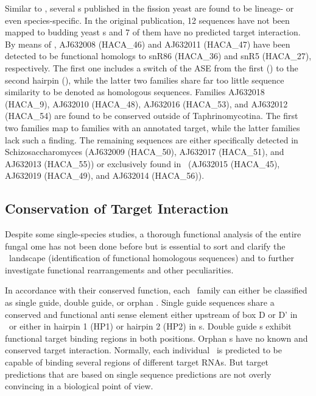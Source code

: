 Similar to \calb, several \sno s published in the fission yeast
\cite{Li:2005} are found to be lineage- or even species-specific. In the
original publication, 12 sequences have not been mapped to budding yeast
\sno s and 7 of them have no predicted target interaction. By means of
\snostrip, AJ632008 (HACA\_46) and AJ632011 (HACA\_47) have been detected
to be functional homologs to snR86 (HACA\_36) and snR5 (HACA\_27),
respectively. The first one includes a switch of the ASE from the first
(\spo) to the second hairpin (\sce), while the latter two families share
far too little sequence similarity to be denoted as homologous
sequences. Families AJ632018 (HACA\_9), AJ632010 (HACA\_48), AJ632016
(HACA\_53), and AJ632012 (HACA\_54) are found to be conserved outside of
Taphrinomycotina. The first two families map to families with an annotated
target, while the latter families lack such a finding. The remaining
sequences are either specifically detected in Schizosaccharomyces (AJ632009
(HACA\_50), AJ632017 (HACA\_51), and AJ632013 (HACA\_55)) or exclusively
found in \spo\ (AJ632015 (HACA\_45), AJ632019 (HACA\_49), and AJ632014
(HACA\_56)).

\subsection{Conservation of Target Interaction}

Despite some single-species studies, a thorough functional analysis of the
entire fungal \sno ome has not been done before but is essential to sort
and clarify the \sno\ landscape (identification of functional homologous
sequences) and to further investigate functional rearrangements and other
peculiarities.

In accordance with their conserved function, each \sno\ family can either
be classified as single guide, double guide, or orphan \sno. Single guide
sequences share a conserved and functional anti sense element either
upstream of box D or D' in \cd\ or either in hairpin 1 (HP1) or hairpin 2
(HP2) in \haca s. Double guide \sno s exhibit functional target binding
regions in both positions. Orphan \sno s have no known and conserved target
interaction. Normally, each individual \sno\ is predicted to be capable of
binding several regions of different target RNAs. But target predictions
that are based on single sequence predictions are not overly convincing in
a biological point of view.

